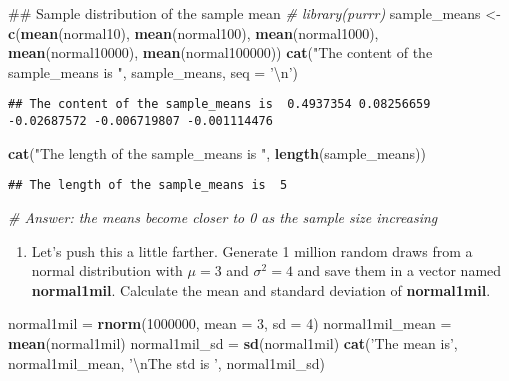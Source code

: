 \documentclass[]{article}
\newenvironment{Shaded}{\begin{snugshade}}{\end{snugshade}}
\newcommand{\KeywordTok}[1]{\textcolor[rgb]{0.13,0.29,0.53}{\textbf{#1}}}
\newcommand{\DataTypeTok}[1]{\textcolor[rgb]{0.13,0.29,0.53}{#1}}
\newcommand{\DecValTok}[1]{\textcolor[rgb]{0.00,0.00,0.81}{#1}}
\newcommand{\CharTok}[1]{\textcolor[rgb]{0.31,0.60,0.02}{#1}}
\newcommand{\StringTok}[1]{\textcolor[rgb]{0.31,0.60,0.02}{#1}}
\newcommand{\CommentTok}[1]{\textcolor[rgb]{0.56,0.35,0.01}{\textit{#1}}}
\newcommand{\NormalTok}[1]{#1}
\providecommand{\tightlist}{%
  \setlength{\itemsep}{0pt}\setlength{\parskip}{0pt}}
\begin{document}
\begin{Shaded}
\begin{Highlighting}[]
\NormalTok{## Sample distribution of the sample mean}
\CommentTok{# library(purrr)}
\NormalTok{sample_means <-}\StringTok{ }\KeywordTok{c}\NormalTok{(}\KeywordTok{mean}\NormalTok{(normal10), }\KeywordTok{mean}\NormalTok{(normal100), }\KeywordTok{mean}\NormalTok{(normal1000), }\KeywordTok{mean}\NormalTok{(normal10000), }\KeywordTok{mean}\NormalTok{(normal100000))}
\KeywordTok{cat}\NormalTok{(}\StringTok{"The content of the sample_means is "}\NormalTok{, sample_means, }\DataTypeTok{seq =} \StringTok{'}\CharTok{\textbackslash{}n}\StringTok{'}\NormalTok{)}
\end{Highlighting}
\end{Shaded}

\begin{verbatim}
## The content of the sample_means is  0.4937354 0.08256659 -0.02687572 -0.006719807 -0.001114476
\end{verbatim}

\begin{Shaded}
\begin{Highlighting}[]
\KeywordTok{cat}\NormalTok{(}\StringTok{"The length of the sample_means is "}\NormalTok{, }\KeywordTok{length}\NormalTok{(sample_means))}
\end{Highlighting}
\end{Shaded}

\begin{verbatim}
## The length of the sample_means is  5
\end{verbatim}

\begin{Shaded}
\begin{Highlighting}[]
\CommentTok{# Answer: the means become closer to 0 as the sample size increasing}
\end{Highlighting}
\end{Shaded}

\begin{enumerate}
\def\labelenumi{\arabic{enumi})}
\setcounter{enumi}{4}
\tightlist
\item
  Let's push this a little farther. Generate 1 million random draws from
  a normal distribution with \(\mu = 3\) and \(\sigma^2 = 4\) and save
  them in a vector named \textbf{normal1mil}. Calculate the mean and
  standard deviation of \textbf{normal1mil}.
\end{enumerate}

\begin{Shaded}
\begin{Highlighting}[]
\NormalTok{normal1mil =}\StringTok{ }\KeywordTok{rnorm}\NormalTok{(}\DecValTok{1000000}\NormalTok{, }\DataTypeTok{mean =} \DecValTok{3}\NormalTok{, }\DataTypeTok{sd =} \DecValTok{4}\NormalTok{)}
\NormalTok{normal1mil_mean =}\StringTok{ }\KeywordTok{mean}\NormalTok{(normal1mil)}
\NormalTok{normal1mil_sd =}\StringTok{ }\KeywordTok{sd}\NormalTok{(normal1mil)}
\KeywordTok{cat}\NormalTok{(}\StringTok{'The mean is'}\NormalTok{, normal1mil_mean, }\StringTok{'}\CharTok{\textbackslash{}n}\StringTok{The std is '}\NormalTok{, normal1mil_sd)}
\end{Highlighting}
\end{Shaded}
\end{document}
